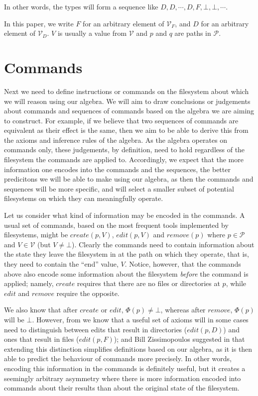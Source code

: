 \documentclass[12pt]{article}
\newcommand{\setv}{\mathcal{V}}
\newcommand{\setvx}[1]{\mathcal{V}_{#1}}
\newcommand{\setf}{\setvx{F}}
\newcommand{\setd}{\setvx{D}}
\newcommand{\setp}{\mathcal{P}}
\newcommand{\empt}{\bot}
\newcommand{\FS}{\Phi} %
\theoremstyle{definition}
\begin{document}


In other words, the types will form a sequence like $D,D,\cdots,D,F,\empt,\empt,\cdots$.

In this paper, we write $F$ for an arbitrary element of $\setf$, and $D$ for an arbitrary element
of $\setd$. $V$ is usually a value from $\setv$ and $p$ and $q$ are paths in $\setp$.

\section{Commands}

Next we need to define instructions or commands on the filesystem about which we will reason
using our algebra.
We will aim to draw conclusions or judgements about commands and sequences of commands
based on the algebra we are aiming to construct.
For example, if we believe that two sequences of commands are equivalent as their effect
is the same, then we aim to be able to derive this from the axioms and inference rules of the
algebra.
As the algebra operates on commands only,
these judgements, by definition, need to hold regardless of the filesystem the commands are applied to.
Accordingly, we expect that the more information one encodes into the commands and the sequences,
the better predicitons we will be able to make using our algebra,
as then the commands and sequences will be more specific, and will select a smaller subset
of potential filesystems on which they can meaningfully operate.

Let us consider what kind of information may be encoded in the commands.
A usual set of commands, based on the most frequent tools implemented by filesystems,
might be $create(p,V)$, $edit(p,V)$ and $remove(p)$ where $p\in\setp$ and $V\in\setv$ (but $V\neq\empt$).
Clearly the commands need to contain information about the state they leave the filesystem
in at the path on which they operate, that is, they need to contain the ``end'' value, $V$.
Notice, however, that the commands above also encode some information about the filesystem
{\it before} the command is applied; namely, $create$ requires that there are no files
or directories at $p$, while $edit$ and $remove$ require the opposite.

We also know that after $create$ or $edit$, $\FS(p)\neq\empt$, whereas after $remove$,
$\FS(p)$ will be $\empt$. However, from \cite{NREC:alg} we know that a useful set of axioms
will in some cases need to distinguish between edits that result in directories ($edit(p,D)$) and
ones that result in files ($edit(p,F)$);
and Bill Zissimopoulos suggested in \cite{BZ} that extending this distinction simplifies
definitions based on our algebra, as it is then able to predict the behaviour of commands
more precisely. 
In other words, encoding this information in the commands is definitely useful,
but it creates a seemingly arbitrary asymmetry where
there is more information encoded into commands about their results than about the
original state of the filesystem.
\end{document}

